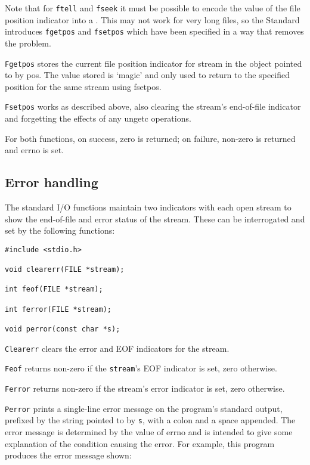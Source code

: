   Note that for \texttt{ftell} and \texttt{fseek} it must be
   possible to  encode the  value of the file position indicator into
   a \klong.  This may not work for very long files, so the Standard
   introduces \texttt{fgetpos}  and \texttt{fsetpos} which have been
   specified in a way that removes the problem.


  \texttt{Fgetpos} stores  the  current  file  position  indicator  for
   stream in the object pointed to by pos.  The value stored is `magic'
   and only used to return to  the  specified  position for the same stream
   using fsetpos.


  \texttt{Fsetpos} works as described above, also clearing the stream's
   end-of-file indicator  and  forgetting  the  effects of any ungetc
   operations.


  For  both  functions,  on  success,  zero  is  returned;  on failure,
   non-zero is returned and errno is set.


  \subsection{Error handling}
   

   The standard I/O functions maintain two indicators with each open stream
    to show the end-of-file and error status of the stream.  These can be
    interrogated and set by the following functions:


   \begin{Verbatim}
#include <stdio.h>

void clearerr(FILE *stream);

int feof(FILE *stream);

int ferror(FILE *stream);

void perror(const char *s);
\end{Verbatim}

   \texttt{Clearerr} clears the error and EOF indicators for the
    stream.


   \texttt{Feof} returns non-zero if the \texttt{stream}'s EOF
    indicator is  set, zero otherwise.


   \texttt{Ferror} returns non-zero if the stream's error indicator is
    set, zero otherwise.


   \texttt{Perror} prints a single-line error message on the program's
    standard  output, prefixed by the string pointed to by \texttt{s},
    with a colon and a space appended.  The error message is determined by
    the value of errno and is intended to give some explanation of the
    condition causing the error.  For example, this program produces the
    error message shown:


